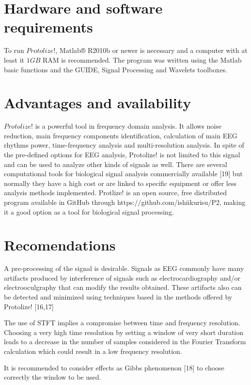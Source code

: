 \documentclass[12pt, a4paper]{article}
\begin{document}
\section{Hardware and software requirements}

To run $Protolize!$, Matlab® R2010b or newer is necessary and a computer with at least it $1GB$ RAM is recommended. The program was written using the Matlab basic functions and the GUIDE, Signal Processing and Wavelets toolboxes.

\section{Advantages and availability}

$Protolize!$ is a powerful tool in frequency domain analysis. It allows noise reduction, main frequency components identification, calculation of main EEG rhythms power, time-frequency analysis and multi-resolution analysis. In spite of the pre-defined options for EEG analysis, Protolize! is not limited to this signal and can be used to analyze other kinds of signals as well. There are several computational tools for biological signal analysis commercially available [19] but normally they have a high cost or are linked to specific equipment or offer less analysis methods implemented. Protlize! is an open source, free distributed program available in GitHub through https://github.com/ishiikurisu/P2, making it a good option as a tool for biological signal processing. 

\section{Recomendations}

A pre-processing of the signal is desirable. Signals as EEG commonly have many artifacts produced by interference of signals such as electrocardiography and/or electrooculgraphy that can modify the results obtained. These artifacts also can be detected and minimized using techniques based in the methods offered by Protolize! [16,17] 

The use of STFT implies a compromise between time and frequency resolution. Choosing a very high time resolution by setting a window of very short duration leads to a decrease in the number of samples considered in the Fourier Transform calculation which could result in a low frequency resolution. 

It is recommended to consider effects as Gibbs phenomenon [18] to choose correctly the window to be used.
\end{document}
